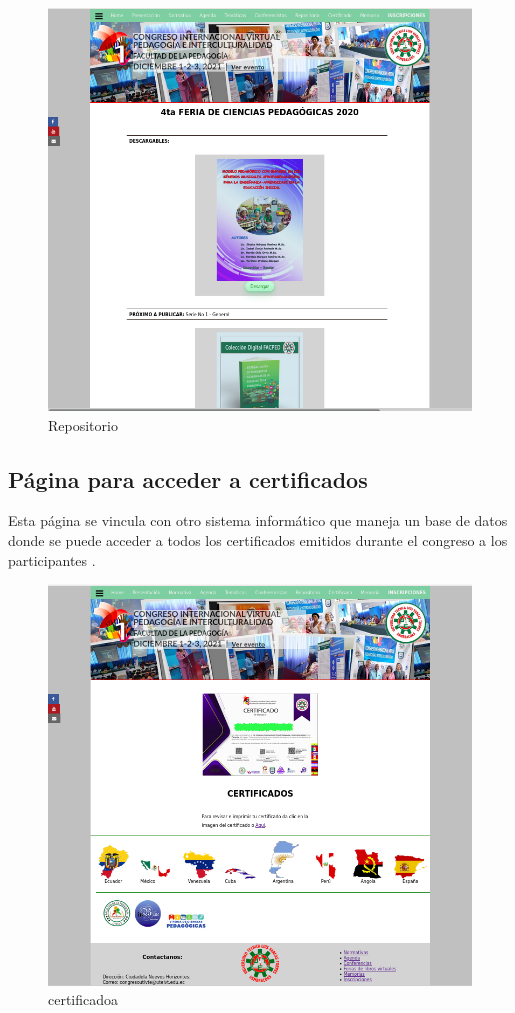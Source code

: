 \documentclass[a4paper,14px]{article}
\begin{document}
\begin{figure}[H]
  \centering
  \includegraphics[scale=0.6]{repositorio.png}
  \caption{Repositorio}
  \label{fig:arquitectura}
\end{figure}

\newpage
\subsection{Página para acceder a certificados }
\label{sec:pagina-principal}

Esta página se vincula con otro sistema informático que maneja un base de datos donde se puede acceder a todos los certificados emitidos durante el congreso a los participantes
.



\begin{figure}[H]
  \centering
  \includegraphics[scale=0.6]{certificado.png}
  \caption{certificadoa}
  \label{fig:arquitectura}
\end{figure}
\end{document}
